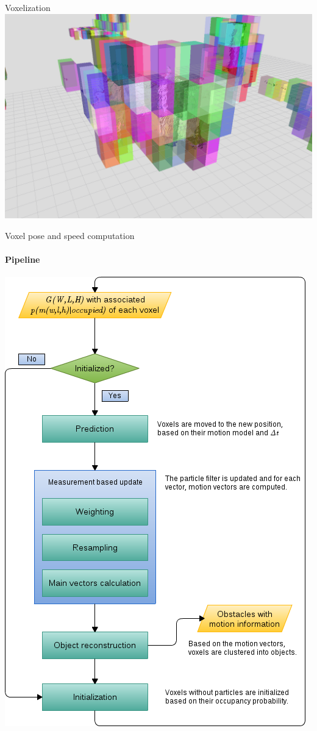 \begin{frame}{Voxelization}
  \includegraphics{voxelization}
\end{frame}

\begin{frame}{Voxel pose and speed computation}
  \framesubtitle{Pipeline}
  \begin{center}
    \includegraphics{voxelPoseAndSpeedComputation}
  \end{center}
\end{frame}

